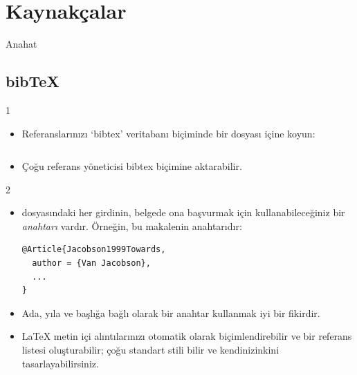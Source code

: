 \documentclass[aspectratio=169]{beamer}
\begin{document}
\section{Kaynakçalar}

\begin{frame}{Anahat}
\begin{multicols}{2}
\tableofcontents[currentsection]
\end{multicols}
\end{frame}

\subsection{bib\TeX}
\begin{frame}[fragile]{\insertsubsection{} 1}
\begin{itemize}
\item Referanslarınızı `bibtex' veritabanı biçiminde bir  dosyası içine koyun:
\inputminted[fontsize=\scriptsize,frame=single]{latex}{bib-example.bib}
\item Çoğu referans yöneticisi bibtex biçimine aktarabilir.
\end{itemize}
\end{frame}

\begin{frame}[fragile]{\insertsubsection{} 2}
\begin{itemize}
	\item {} dosyasındaki her girdinin, belgede ona başvurmak için kullanabileceğiniz bir \emph{anahtarı} vardır. Örneğin,  bu makalenin anahtarıdır:

\begin{verbatim}
@Article{Jacobson1999Towards,
  author = {Van Jacobson},
  ...
}
\end{verbatim}
\item Ada, yıla ve başlığa bağlı olarak bir anahtar kullanmak iyi bir fikirdir.
\item \LaTeX{} metin içi alıntılarınızı otomatik olarak biçimlendirebilir ve bir referans listesi oluşturabilir; çoğu standart stili bilir ve kendinizinkini tasarlayabilirsiniz.
\end{itemize}
\end{frame}
\end{document}
